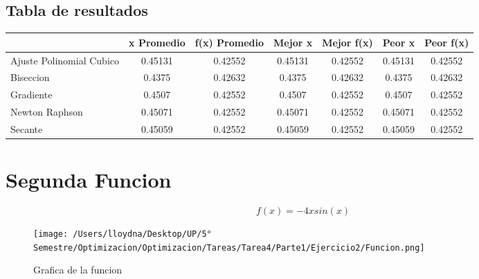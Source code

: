 \documentclass{report}
\begin{document}
            \subsection{Tabla de resultados}
                \begin{tabular}{l|c|c|c|c|c|c}
                    & x Promedio & f(x) Promedio & Mejor x & Mejor f(x) & Peor x & Peor f(x)\\
                    \hline
                    Ajuste Polinomial Cubico & 0.45131 & 0.42552 & 0.45131 & 0.42552 & 0.45131 & 0.42552\\
                    \hline
                    Biseccion & 0.4375 & 0.42632 & 0.4375 & 0.42632 & 0.4375 & 0.42632\\
                    \hline
                    Gradiente & 0.4507 & 0.42552 & 0.4507 & 0.42552 & 0.4507 & 0.42552\\
                    \hline
                    Newton Raphson & 0.45071 & 0.42552 & 0.45071 & 0.42552 & 0.45071 & 0.42552\\
                    \hline
                    Secante & 0.45059 & 0.42552 & 0.45059 & 0.42552 & 0.45059 & 0.42552\\
                    \hline
                \end{tabular}
        \pagebreak

        \section{Segunda Funcion}
            \begin{equation*}
                f(x)=-4xsin(x)
            \end{equation*}

            \begin{figure}[H]
                \texttt{[image: /Users/lloydna/Desktop/UP/5° Semestre/Optimizacion/Optimizacion/Tareas/Tarea4/Parte1/Ejercicio2/Funcion.png]}
                \caption{Grafica de la funcion}
                \label{fig:fun12}
            \end{figure}
\end{document}
